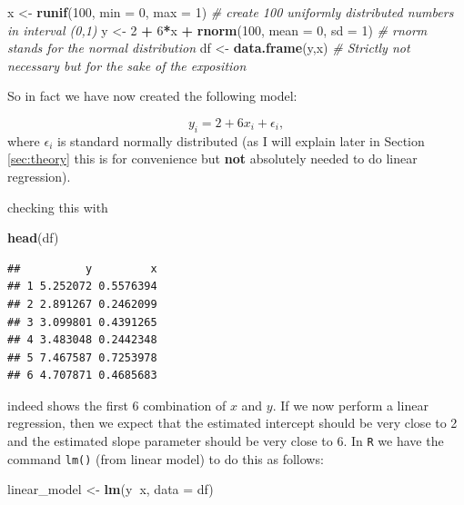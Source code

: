 \documentclass[]{article}
\newenvironment{Shaded}{\begin{snugshade}}{\end{snugshade}}
\newcommand{\KeywordTok}[1]{\textcolor[rgb]{0.13,0.29,0.53}{\textbf{#1}}}
\newcommand{\DataTypeTok}[1]{\textcolor[rgb]{0.13,0.29,0.53}{#1}}
\newcommand{\DecValTok}[1]{\textcolor[rgb]{0.00,0.00,0.81}{#1}}
\newcommand{\StringTok}[1]{\textcolor[rgb]{0.31,0.60,0.02}{#1}}
\newcommand{\CommentTok}[1]{\textcolor[rgb]{0.56,0.35,0.01}{\textit{#1}}}
\newcommand{\OperatorTok}[1]{\textcolor[rgb]{0.81,0.36,0.00}{\textbf{#1}}}
\newcommand{\NormalTok}[1]{#1}
\theoremstyle{definition}
\theoremstyle{definition}
\theoremstyle{definition}
\theoremstyle{remark}
\begin{document}
\begin{Shaded}
\begin{Highlighting}[]
\NormalTok{x <-}\StringTok{ }\KeywordTok{runif}\NormalTok{(}\DecValTok{100}\NormalTok{, }\DataTypeTok{min =} \DecValTok{0}\NormalTok{, }\DataTypeTok{max =} \DecValTok{1}\NormalTok{) }\CommentTok{# create 100 uniformly distributed numbers in interval (0,1)}
\NormalTok{y <-}\StringTok{ }\DecValTok{2} \OperatorTok{+}\StringTok{ }\DecValTok{6}\OperatorTok{*}\NormalTok{x }\OperatorTok{+}\StringTok{ }\KeywordTok{rnorm}\NormalTok{(}\DecValTok{100}\NormalTok{, }\DataTypeTok{mean =} \DecValTok{0}\NormalTok{, }\DataTypeTok{sd =} \DecValTok{1}\NormalTok{) }\CommentTok{# rnorm stands for the normal distribution}
\NormalTok{df <-}\StringTok{ }\KeywordTok{data.frame}\NormalTok{(y,x) }\CommentTok{# Strictly not necessary but for the sake of the exposition}
\end{Highlighting}
\end{Shaded}

So in fact we have now created the following model:

\[
y_i = 2 + 6 x_i + \epsilon_i,
\] where \(\epsilon_i\) is standard normally distributed (as I will
explain later in Section \ref{sec:theory} this is for convenience but
\textbf{not} absolutely needed to do linear regression).

checking this with

\begin{Shaded}
\begin{Highlighting}[]
\KeywordTok{head}\NormalTok{(df)}
\end{Highlighting}
\end{Shaded}

\begin{verbatim}
##          y         x
## 1 5.252072 0.5576394
## 2 2.891267 0.2462099
## 3 3.099801 0.4391265
## 4 3.483048 0.2442348
## 5 7.467587 0.7253978
## 6 4.707871 0.4685683
\end{verbatim}

indeed shows the first 6 combination of \(x\) and \(y\). If we now
perform a linear regression, then we expect that the estimated intercept
should be very close to 2 and the estimated slope parameter should be
very close to 6. In \texttt{R} we have the command \texttt{lm()} (from
linear model) to do this as follows:

\begin{Shaded}
\begin{Highlighting}[]
\NormalTok{linear_model <-}\StringTok{ }\KeywordTok{lm}\NormalTok{(y}\OperatorTok{~}\NormalTok{x, }\DataTypeTok{data =}\NormalTok{ df)}
\end{Highlighting}
\end{Shaded}
\end{document}

